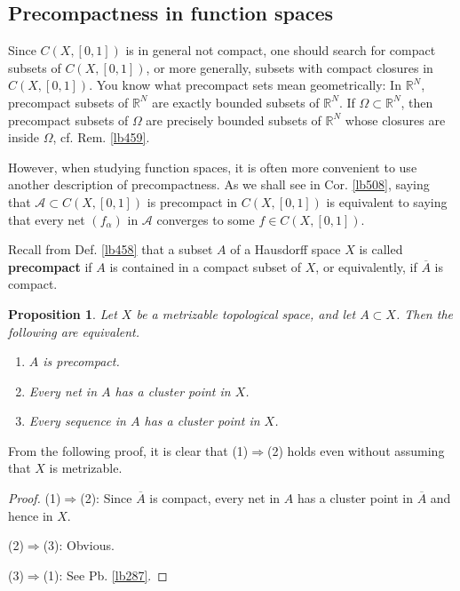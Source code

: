 \documentclass[12pt,b5paper,notitlepage]{article}
\theoremstyle{definition}
\theoremstyle{plain}
\newtheorem{pp}[df]{Proposition}
\newcommand{\ovl}{\overline}
\newcommand{\scr}{\mathscr}
\newcommand{\Rbb}{\mathbb R}
\numberwithin{equation}{section}
\begin{document}
\subsection{Precompactness in function spaces}


Since $C(X,[0,1])$ is in general not compact, one should search for compact subsets of $C(X,[0,1])$, or more generally, subsets with compact closures in $C(X,[0,1])$. You know what precompact sets mean geometrically: In $\Rbb^N$, precompact subsets of $\Rbb^N$ are exactly bounded subsets of $\Rbb^N$. If $\Omega\subset\Rbb^N$, then precompact subsets of $\Omega$ are precisely bounded subsets of $\Rbb^N$ whose closures are inside $\Omega$, cf. Rem. \ref{lb459}. 

However, when studying function spaces, it is often more convenient to use another description of precompactness. As we shall see in Cor. \ref{lb508}, saying that $\scr A\subset C(X,[0,1])$ is precompact in $C(X,[0,1])$ is equivalent to saying that every net $(f_\alpha)$ in $\scr A$ converges to some $f\in C(X,[0,1])$.






Recall from Def. \ref{lb458} that a subset $A$ of a Hausdorff space $X$ is called \textbf{precompact} if $A$ is contained in a compact subset of $X$, or equivalently, if $\ovl A$ is compact. %


\begin{pp}\label{lb505}
Let $X$ be a metrizable topological space, and let $A\subset X$. Then the following are equivalent.
\begin{enumerate}[label=(\arabic*)]
\item $A$ is precompact.
\item Every net in $A$ has a cluster point in $X$.
\item Every sequence in $A$ has a cluster point in $X$.
\end{enumerate}
\end{pp}

From the following proof, it is clear that (1)$\Rightarrow$(2) holds even without assuming that $X$ is metrizable.

\begin{proof}
(1)$\Rightarrow$(2): Since $\ovl A$ is compact, every net in $A$ has a cluster point in $\ovl A$ and hence in $X$. 

(2)$\Rightarrow$(3): Obvious.

(3)$\Rightarrow$(1): See Pb. \ref{lb287}.
\end{proof}
\end{document}

